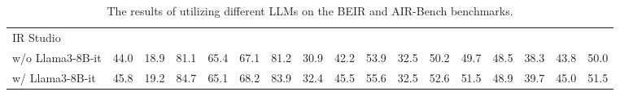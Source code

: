 \begin{table*}[ht]
{\begin{tabular}{l|ccccccccc|cccccc|c}
        \midrule
        \multicolumn{17}{l}{IR Studio} \\
        w/o Llama3-8B-it & 44.0 & 18.9 & 81.1 & 65.4 & 67.1 & 81.2 & 30.9 & 42.2 & 53.9 & 32.5 & 50.2 & 49.7 & 48.5 & 38.3 & 43.8 & 50.0 \\
        w/ Llama3-8B-it & 45.8 & 19.2 & 84.7 & 65.1 & 68.2 & 83.9 & 32.4 & 45.5 & 55.6 & 32.5 & 52.6 & 51.5 & 48.9 & 39.7 & 45.0 & 51.5 \\
        \bottomrule
    \end{tabular}%
    }
    \vspace{0.1cm}
    \caption{The results of utilizing different LLMs on the BEIR and AIR-Bench benchmarks.}
    \label{compare}
\end{table*}


